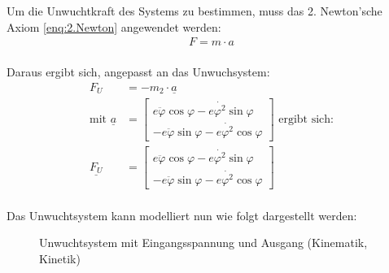 Um die Unwuchtkraft des Systems zu bestimmen, muss das 2. Newton'sche Axiom \ref{enq:2.Newton} angewendet werden:
\begin{equation}
	\begin{aligned}
		F = m \cdot a \\
		\label{enq:2.Newton}
	\end{aligned}
\end{equation}

Daraus ergibt sich, angepasst an das Unwuchsystem:
\begin{equation}
\begin{aligned}
	F_U &= -m_2 \cdot \underline{a} \\
	\text{mit } \underline{a} &= \begin{bmatrix} e \ddot{\varphi} \cos \varphi  - e \dot{\varphi^2} \sin\varphi \\
	-e \ddot{\varphi} \sin \varphi  - e \dot{\varphi^2} \cos \varphi \end{bmatrix} \text{ ergibt sich:} \\
	\underline{F_U} &= \begin{bmatrix} e \ddot{\varphi} \cos \varphi  - e \dot{\varphi^2} \sin\varphi \\
	-e \ddot{\varphi} \sin \varphi  - e \dot{\varphi^2} \cos \varphi \end{bmatrix} \\
	\label{enq:Unwuchtkraft}
\end{aligned}
\end{equation}

Das Unwuchtsystem kann modelliert nun wie folgt dargestellt werden:

\begin{figure}[hbt]
	
	\caption{Unwuchtsystem mit Eingangsspannung und Ausgang (Kinematik, Kinetik)}
	\label{fig:Unwuchtsystem}
	
\end{figure}